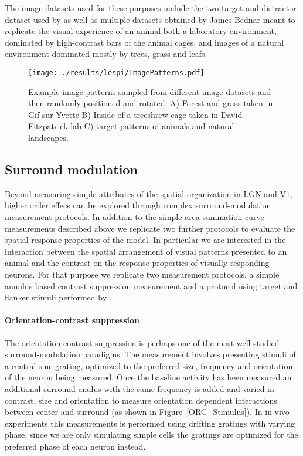 The image datasets used for these purposes include the two target and
distractor dataset used by \cite{Serre2007} as well as multiple
datasets obtained by James Bednar meant to replicate the visual
experience of an animal both a laboratory environment, dominated by
high-contrast bars of the animal cages, and images of a natural
environment dominated mostly by trees, grass and leafs.

\begin{figure}
	\centering
	\texttt{[image: ./results/lespi/ImagePatterns.pdf]}
	\caption[Example image patterns used to train the model] {Example
      image patterns sampled from different image datasets and then
      randomly positioned and rotated. A) Forest and grass taken in
      Gif-sur-Yvette B) Inside of a treeshrew cage taken in David
      Fitzpatrick lab C) \cite{Serre07} target patterns of animals and
      natural landscapes.}
    \label{image_patterns}
\end{figure}

\subsection{Surround modulation}

Beyond measuring simple attributes of the spatial organization in LGN
and V1, higher order effecs can be explored through complex 
surround-modulation measurement protocols. In addition to the simple area
summation curve measurements described above we replicate two further
protocols to evaluate the spatial response properties of the model.
In particular we are interested in the interaction between the spatial
arrangement of visual patterns presented to an animal and the contrast
on the response properties of visually responding neurons. For that
purpose we replicate two measurement protocols, a simple annulus based
contrast suppression measurement \cite{Jones2002} and a protocol using
target and flanker stimuli performed by \cite{Kapadia1995}.

\paragraph{Orientation-contrast suppression}

The orientation-contrast suppression is perhaps one of the most well
studied surround-modulation paradigms. The measurement involves
presenting stimuli of a central sine grating, optimized to the
preferred size, frequency and orientation of the neuron being
measured. Once the baseline activity has been measured an additional
surround anulus with the same frequency is added and varied in
contrast, size and orientation to measure orientation dependent
interactions between center and surround (as shown in
Figure~\ref{ORC_Stimulus}). In in-vivo experiments this measurements
is performed using drifting gratings with varying phase, since we are
only simulating simple cells the gratings are optimized for the
preferred phase of each neuron instead.

